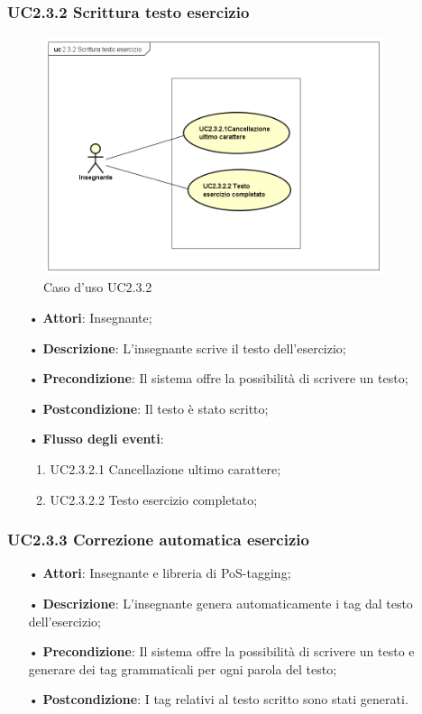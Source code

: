 \subsubsection{UC2.3.2 Scrittura testo esercizio}

\begin{figure}[H]
	\centering
	\includegraphics[width=10cm]{img/UC232.png} 
	\caption{Caso d'uso UC2.3.2}
\end{figure}

\begin{itemize}
	\item[•] \textbf{Attori}: Insegnante;
	\item[•] \textbf{Descrizione}: L'insegnante scrive il testo dell’esercizio;
	\item[•] \textbf{Precondizione}: Il sistema offre la possibilità di scrivere un testo;
	\item[•] \textbf{Postcondizione}: Il testo è stato scritto;
	\item[•] \textbf{Flusso degli eventi}:
	\begin{enumerate}
		\item UC2.3.2.1	Cancellazione ultimo carattere;
		\item UC2.3.2.2	Testo esercizio completato;
	\end{enumerate}
\end{itemize}


\subsubsection{UC2.3.3	Correzione automatica esercizio}
\begin{itemize}
	\item[•] \textbf{Attori}: Insegnante e libreria di PoS-tagging;
	\item[•] \textbf{Descrizione}: L’insegnante genera automaticamente i tag dal testo dell’esercizio;
	\item[•] \textbf{Precondizione}: Il sistema offre la possibilità di scrivere un testo e generare dei tag grammaticali per ogni parola del testo;
	\item[•] \textbf{Postcondizione}: I tag relativi al testo scritto sono stati generati.
\end{itemize}


